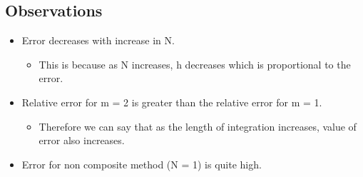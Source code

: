 \documentclass[12pt]{article}
\begin{document}
\subsection{Observations}
\begin{itemize}
\item Error decreases with increase in N.
  	\begin{itemize}
  		\item This is because as N increases, h decreases which is proportional to the error.
  	\end{itemize}
\item Relative error for m = 2 is greater than the relative error for m = 1. 
	\begin{itemize}
		\item Therefore we can say that as the length of integration increases, value of error also increases.
	\end{itemize}
\item Error for non composite method (N = 1) is quite high.
\end{itemize}
\end{document}
